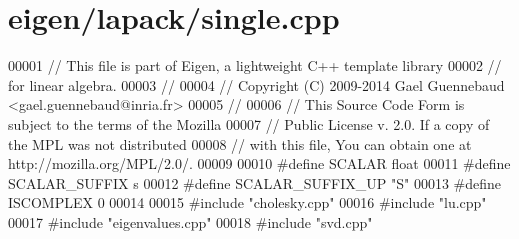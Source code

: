 \hypertarget{eigen_2lapack_2single_8cpp_source}{}\section{eigen/lapack/single.cpp}
\label{eigen_2lapack_2single_8cpp_source}

\begin{DoxyCode}
00001 \textcolor{comment}{// This file is part of Eigen, a lightweight C++ template library}
00002 \textcolor{comment}{// for linear algebra.}
00003 \textcolor{comment}{//}
00004 \textcolor{comment}{// Copyright (C) 2009-2014 Gael Guennebaud <gael.guennebaud@inria.fr>}
00005 \textcolor{comment}{//}
00006 \textcolor{comment}{// This Source Code Form is subject to the terms of the Mozilla}
00007 \textcolor{comment}{// Public License v. 2.0. If a copy of the MPL was not distributed}
00008 \textcolor{comment}{// with this file, You can obtain one at http://mozilla.org/MPL/2.0/.}
00009 
00010 \textcolor{preprocessor}{#define SCALAR        float}
00011 \textcolor{preprocessor}{#define SCALAR\_SUFFIX s}
00012 \textcolor{preprocessor}{#define SCALAR\_SUFFIX\_UP "S"}
00013 \textcolor{preprocessor}{#define ISCOMPLEX     0}
00014 
00015 \textcolor{preprocessor}{#include "cholesky.cpp"}
00016 \textcolor{preprocessor}{#include "lu.cpp"}
00017 \textcolor{preprocessor}{#include "eigenvalues.cpp"}
00018 \textcolor{preprocessor}{#include "svd.cpp"}
\end{DoxyCode}
